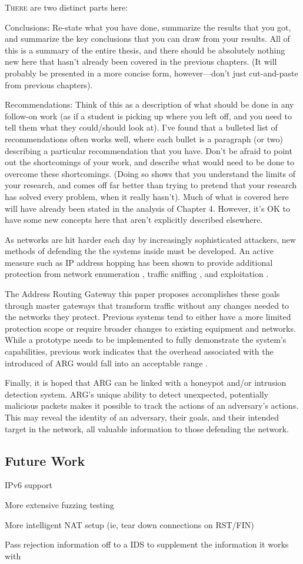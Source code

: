 \lettrine{T}{here} are two distinct parts here:

\par Conclusions: Re-state what you have done, summarize the results that you got,
and summarize the key conclusions that you can draw from your results. All of
this is a summary of the entire thesis, and there should be absolutely nothing new
here that hasn’t already been covered in the previous chapters. (It will probably
be presented in a more concise form, however—don’t just cut-and-paste from
previous chapters).

\par Recommendations: Think of this as a description of what should be done in any
follow-on work (as if a student is picking up where you left off, and you need to
tell them what they could/should look at). I’ve found that a bulleted list of
recommendations often works well, where each bullet is a paragraph (or two)
describing a particular recommendation that you have. Don’t be afraid to point
out the shortcomings of your work, and describe what would need to be done to
overcome these shortcomings. (Doing so shows that you understand the limits of
your research, and comes off far better than trying to pretend that your research
has solved every problem, when it really hasn’t). Much of what is covered here
will have already been stated in the analysis of Chapter 4. However, it’s OK to
have some new concepts here that aren’t explicitly described elsewhere.

\par As networks are hit harder each day by increasingly sophisticated attackers, new methods of defending the the systems inside must be developed. An active measure such as IP address hopping has been shown to provide additional protection from network enumeration \cite{NAH}, traffic sniffing \cite{BBNDYNAT}, and exploitation \cite{APOD}.

\par The Address Routing Gateway this paper proposes accomplishes these goals through master gateways that transform traffic without any changes needed to the networks they protect. Previous systems tend to either have a more limited protection scope or require broader changes to existing equipment and networks. While a prototype needs to be implemented to fully demonstrate the system's capabilities, previous work indicates that the overhead associated with the introduced of ARG would fall into an acceptable range \cite{NAH}.

\par Finally, it is hoped that ARG can be linked with a honeypot and/or intrusion detection system. ARG's unique ability to detect unexpected, potentially malicious packets makes it possible to track the actions of an adversary's actions. This may reveal the identity of an adversary, their goals, and their intended target in the network, all valuable information to those defending the network.

\subsection{Future Work}
\par IPv6 support
\par More extensive fuzzing testing
\par More intelligent NAT setup (ie, tear down connections on RST/FIN)
\par Pass rejection information off to a \ac{IDS} to supplement the information it works with

